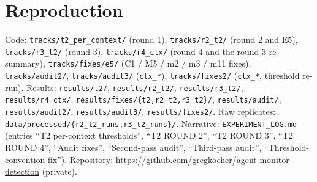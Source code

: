 \documentclass[11pt]{article}
\begin{document}
\section*{Reproduction}
Code: \texttt{tracks/t2\_per\_context/} (round 1), \texttt{tracks/r2\_t2/} (round 2 and E5), \texttt{tracks/r3\_t2/} (round 3), \texttt{tracks/r4\_ctx/} (round 4 and the round-3 re-summary), \texttt{tracks/fixes/e5/} (C1 / M5 / m2 / m3 / m11 fixes), \texttt{tracks/audit2/}, \texttt{tracks/audit3/} (\texttt{ctx\_*}), \texttt{tracks/fixes2/} (\texttt{ctx\_*}, threshold re-run). Results: \texttt{results/t2/}, \texttt{results/r2\_t2/}, \texttt{results/r3\_t2/}, \texttt{results/r4\_ctx/}, \texttt{results/fixes/\{t2,r2\_t2,r3\_t2\}/}, \texttt{results/audit/}, \texttt{results/audit2/}, \texttt{results/audit3/}, \texttt{results/fixes2/}. Raw replicates: \texttt{data/processed/\{r2\_t2\_runs,r3\_t2\_runs\}/}. Narrative: \texttt{EXPERIMENT\_LOG.md} (entries ``T2 per-context thresholds'', ``T2 ROUND 2'', ``T2 ROUND 3'', ``T2 ROUND 4'', ``Audit fixes'', ``Second-pass audit'', ``Third-pass audit'', ``Threshold-convention fix''). Repository: \url{https://github.com/gregkocher/agent-monitor-detection} (private).
\end{document}
